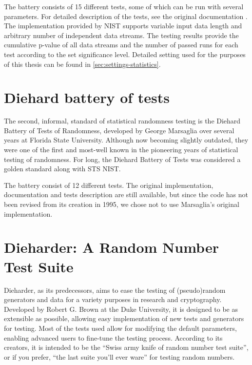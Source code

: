 \documentclass[12pt,oneside]{fithesis2}
\begin{document}
The battery consists of 15 different tests, some of which can be run with several parameters. 
For detailed description of the tests, see the original documentation \cite{sts nist documentation}. 
The implementation provided by NIST supports variable input data length and arbitrary number of independent data streams. 
The testing results provide the cumulative p-value of all data streams and the number of passed runs for each test 
according to the set significance level. 
Detailed setting used for the purposes of this thesis can be found in \autoref{sec:settings-statistics}.

\section{Diehard battery of tests}
\label{sec:diehard}

The second, informal, standard of statistical randomness testing is the Diehard Battery of Tests of Randomness, 
developed by George Marsaglia over several years at Florida State University. \cite{diehard website} 
Although now becoming slightly outdated, they were one of the first and most-well known 
in the pioneering years of statistical testing of randomness. 
For long, the Diehard Battery of Tests was considered a golden standard along with STS NIST.

The battery consist of 12 different tests. The original implementation, documentation and tests description are still available,
but since the code has not been revised from its creation in 1995, we chose not to use Marsaglia's original implementation.

\section{Dieharder: A Random Number Test Suite}
\label{sec:dieharder}

Dieharder, as its predecessors, aims to ease the testing of (pseudo)random generators and data for a variety purposes in research 
and cryptography. Developed by Robert G. Brown at the Duke University, it is designed to be as extensible as possible, 
allowing easy implementation of new tests and generators for testing. Most of the tests used allow for 
modifying the default parameters, enabling advanced users to fine-tune the testing process.
According to its creators, it is intended to be the ``Swiss army knife of random number test suite'', 
or if you prefer, ``the last suite you'll ever ware'' for testing random numbers. \cite{dieharder web}
\end{document}
